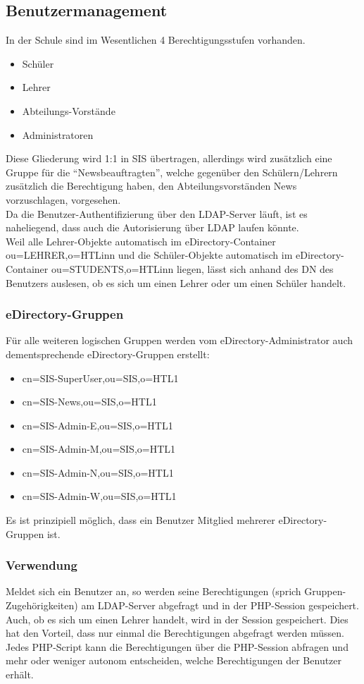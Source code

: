 \subsection{Benutzermanagement}
\label{sec:content_solutions_users}
In der Schule sind im Wesentlichen 4 Berechtigungsstufen vorhanden.
\begin{itemize}
	\item Schüler
	\item Lehrer
	\item Abteilungs-Vorstände
	\item Administratoren
\end{itemize}
Diese Gliederung wird 1:1 in SIS übertragen, allerdings wird zusätzlich eine Gruppe für die \enquote{Newsbeauftragten}, welche gegenüber den Schülern/Lehrern zusätzlich die Berechtigung haben, den Abteilungsvorständen News vorzuschlagen, vorgesehen.\\
Da die Benutzer-Authentifizierung über den LDAP-Server läuft, ist es naheliegend, dass auch die Autorisierung über LDAP laufen könnte.\\
Weil alle Lehrer-Objekte automatisch im eDirectory-Container ou=LEHRER,o=HTLinn und die Schüler-Objekte automatisch im eDirectory-Container ou=STUDENTS,o=HTLinn liegen, lässt sich anhand des DN des Benutzers auslesen, ob es sich um einen Lehrer oder um einen Schüler handelt.\\
\subsubsection{eDirectory-Gruppen}
Für alle weiteren logischen Gruppen werden vom eDirectory-Administrator auch dementsprechende eDirectory-Gruppen erstellt:
\begin{itemize}
	\item cn=SIS-SuperUser,ou=SIS,o=HTL1
	\item cn=SIS-News,ou=SIS,o=HTL1
	\item cn=SIS-Admin-E,ou=SIS,o=HTL1
	\item cn=SIS-Admin-M,ou=SIS,o=HTL1
	\item cn=SIS-Admin-N,ou=SIS,o=HTL1
	\item cn=SIS-Admin-W,ou=SIS,o=HTL1
\end{itemize}
Es ist prinzipiell möglich, dass ein Benutzer Mitglied mehrerer eDirectory-Gruppen ist.\\
\subsubsection{Verwendung}
Meldet sich ein Benutzer an, so werden seine Berechtigungen (sprich Gruppen-Zugehörigkeiten) am LDAP-Server abgefragt und in der PHP-Session gespeichert. Auch, ob es sich um einen Lehrer handelt, wird in der Session gespeichert. Dies hat den Vorteil, dass nur einmal die Berechtigungen abgefragt werden müssen.\\
Jedes PHP-Script kann die Berechtigungen über die PHP-Session abfragen und mehr oder weniger autonom entscheiden, welche Berechtigungen der Benutzer erhält.